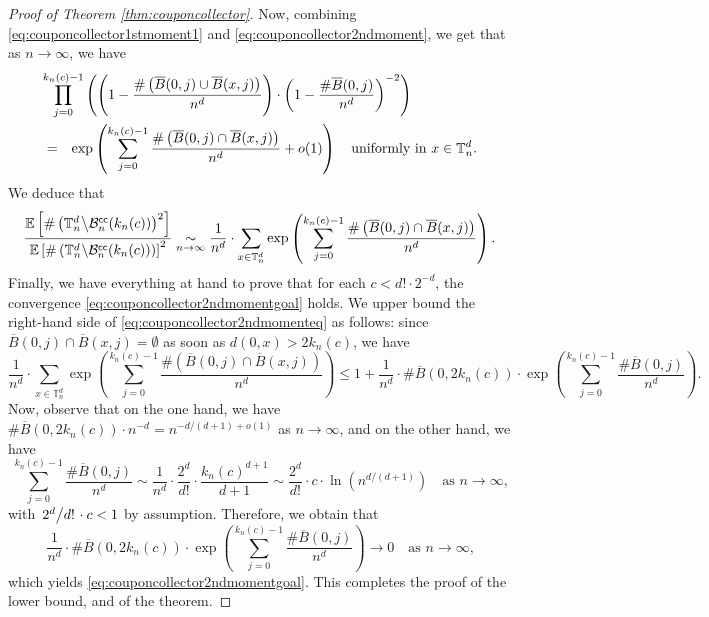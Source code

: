 \documentclass[10pt,a4paper]{amsart}
\theoremstyle{plain}
\theoremstyle{remark}
\begin{document}
\begin{proof}[Proof of Theorem \ref{thm:couponcollector}]
Now, combining \eqref{eq:couponcollector1stmoment1} and \eqref{eq:couponcollector2ndmoment}, we get that as $n\to\infty$, we have
\begin{eqnarray*}
\lefteqn{\prod_{j=0}^{k_n(c)-1}\left(\left(1-\frac{\#\left(\overline{B}(0,j)\cup\overline{B}(x,j)\right)}{n^d}\right)\cdot\left(1-\frac{\#\overline{B}(0,j)}{n^d}\right)^{-2}\right)}\\
&=&\exp\left(\sum_{j=0}^{k_n(c)-1}\frac{\#\left(\overline{B}(0,j)\cap\overline{B}(x,j)\right)}{n^d}+o(1)\right)\quad\text{uniformly in $x\in\mathbb{T}_n^d$.}
\end{eqnarray*}
We deduce that
\begin{equation}\label{eq:couponcollector2ndmomenteq}
\frac{\mathbb{E}\left[\#\left(\mathbb{T}_n^d\middle\backslash\mathcal{B}_n^\mathsf{cc}(k_n(c))\right)^2\right]}{\mathbb{E}\left[\#\left(\mathbb{T}_n^d\middle\backslash\mathcal{B}_n^\mathsf{cc}(k_n(c))\right)\right]^2}\underset{n\to\infty}{\sim}\frac{1}{n^d}\cdot\sum_{x\in\mathbb{T}_n^d}\exp\left(\sum_{j=0}^{k_n(c)-1}\frac{\#\left(\overline{B}(0,j)\cap\overline{B}(x,j)\right)}{n^d}\right).
\end{equation}
Finally, we have everything at hand to prove that for each $c<d!\cdot2^{-d}$, the convergence \eqref{eq:couponcollector2ndmomentgoal} holds.
We upper bound the right-hand side of \eqref{eq:couponcollector2ndmomenteq} as follows: since $\overline{B}(0,j)\cap\overline{B}(x,j)=\emptyset$ as soon as $d(0,x)>2k_n(c)$, we have
\[\frac{1}{n^d}\cdot\sum_{x\in\mathbb{T}_n^d}\exp\left(\sum_{j=0}^{k_n(c)-1}\frac{\#\left(\overline{B}(0,j)\cap\overline{B}(x,j)\right)}{n^d}\right)\leq1+\frac{1}{n^d}\cdot\#\overline{B}(0,2k_n(c))\cdot\exp\left(\sum_{j=0}^{k_n(c)-1}\frac{\#\overline{B}(0,j)}{n^d}\right).\]
Now, observe that on the one hand, we have $\#\overline{B}(0,2k_n(c))\cdot n^{-d}=n^{-d/(d+1)+o(1)}$ as $n\to\infty$, and on the other hand, we have
\[\sum_{j=0}^{k_n(c)-1}\frac{\#\overline{B}(0,j)}{n^d}\sim\frac{1}{n^d}\cdot\frac{2^d}{d!}\cdot\frac{k_n(c)^{d+1}}{d+1}\sim\frac{2^d}{d!}\cdot c\cdot\ln\left(n^{d/(d+1)}\right)\quad\text{as $n\to\infty$,}\]
with $\left.2^d\middle/d!\right.\cdot c<1$ by assumption.
Therefore, we obtain that
\[\frac{1}{n^d}\cdot\#\overline{B}(0,2k_n(c))\cdot\exp\left(\sum_{j=0}^{k_n(c)-1}\frac{\#\overline{B}(0,j)}{n^d}\right)\longrightarrow0\quad\text{as $n\to\infty$,}\]
which yields \eqref{eq:couponcollector2ndmomentgoal}.
This completes the proof of the lower bound, and of the theorem.
\end{proof}
\end{document}
